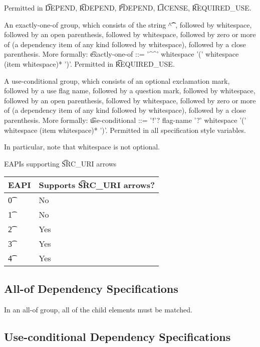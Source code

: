 \begin{compactitem}
    Permitted in \t{DEPEND}, \t{RDEPEND}, \t{PDEPEND}, \t{LICENSE}, \t{REQUIRED\_USE}.
\item An exactly-one-of group, which consists of the string \t{\textasciicircum\textasciicircum},
    followed by whitespace, followed by an open parenthesis, followed by whitespace, followed by
    zero or more of (a dependency item of any kind followed by whitespace), followed by a close
    parenthesis. More formally: \t{exactly-one-of ::= '\textasciicircum\textasciicircum' whitespace
    '(' whitespace (item whitespace)* ')'}.
    Permitted in \t{REQUIRED\_USE}.
\item A use-conditional group, which consists of an optional exclamation mark, followed by
    a use flag name, followed by a question mark, followed by whitespace, followed by
    an open parenthesis, followed by whitespace, followed by zero or more of (a dependency item
    of any kind followed by whitespace), followed by a close parenthesis. More formally:
    \t{use-conditional ::= '!'? flag-name '?' whitespace '(' whitespace (item whitespace)* ')'}.
    Permitted in all specification style variables.
\end{compactitem}

In particular, note that whitespace is not optional.

\begin{centertable}{EAPIs supporting \t{SRC\_URI} arrows} \label{tab:uri-arrows-table}
    \begin{tabular}{ l l }
        \toprule
        \multicolumn{1}{c}{\textbf{EAPI}} &
        \multicolumn{1}{c}{\textbf{Supports \t{SRC\_URI} arrows?}} \\
        \midrule
    \t{0} & No \\
    \t{1} & No \\
    \t{2} & Yes \\
    \t{3} & Yes \\
    \t{4} & Yes \\
    \bottomrule
    \end{tabular}
\end{centertable}

\subsection{All-of Dependency Specifications}

In an all-of group, all of the child elements must be matched.

\subsection{Use-conditional Dependency Specifications}

